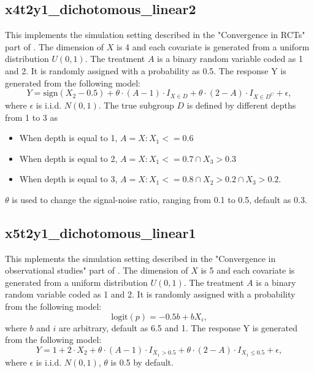 \documentclass[12pt]{article}
\begin{document}
\subsection*{x4t2y1\_dichotomous\_linear2}
This implements the simulation setting described in the "Convergence in RCTs" part of \cite{fu2016estimating}. The dimension of $X$ is 4 and each covariate is generated from a uniform distribution $U(0,1)$. The treatment $A$ is a binary random variable coded as 1 and 2. It is randomly assigned with a probability as 0.5. The response Y is generated from the following model:
\begin{equation*}
Y=\text{sign}(X_2-0.5)+\theta\cdot (A-1) \cdot I_{X\in D} + \theta \cdot(2-A) \cdot I_{X\in D^C}+\epsilon,
\end{equation*}
where $\epsilon$ is i.i.d. $N(0,1)$. The true subgroup $D$ is defined by different depths from 1 to 3 as
\begin{itemize}
	\item When depth is equal to 1, $A={X:X_1<=0.6}$
	\item When depth is equal to 2, $A={X:X_1<=0.7 \cap X_3>0.3}$
	\item When depth is equal to 3, $A={X:X_1<=0.8 \cap X_2>0.2 \cap X_3>0.2}$.
\end{itemize}
$\theta$ is used to change the signal-noise ratio, ranging from 0.1 to 0.5, default as 0.3.

\subsection*{x5t2y1\_dichotomous\_linear1}
This mplements the simulation setting described in the "Convergence in observational studies" part of \cite{fu2016estimating}. The dimension of $X$ is 5 and each covariate is generated from a uniform distribution $U(0,1)$. The treatment $A$ is a binary random variable coded as 1 and 2. It is randomly assigned with a probability from the following model:
\begin{equation*}
\text{logit}(p)=-0.5b+bX_i,
\end{equation*} 
where $b$ and $i$ are arbitrary, default as 6.5 and 1. The response Y is generated from the following model:
\begin{equation*}
Y=1+2\cdot X_2+\theta \cdot (A-1)\cdot I_{X_1>0.5}+\theta \cdot (2-A)\cdot I_{X_1\le 0.5}+\epsilon,
\end{equation*}
where $\epsilon$ is i.i.d. $N(0,1)$, $\theta$ is 0.5 by default.
\end{document}
